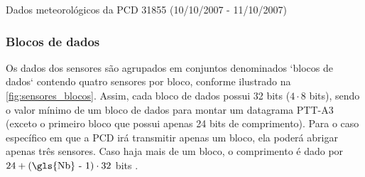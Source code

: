 \begin{quadro}[ht]
\caption{Dados meteorológicos da PCD 31855 (10/10/2007 - 11/10/2007)}\label{quadro:dados-meteorologicos}

\end{quadro}


\subsubsection{Blocos de dados}

Os dados dos sensores são agrupados em conjuntos denominados `blocos de dados` contendo quatro sensores por bloco, conforme ilustrado na \autoref{fig:sensores_blocos}. Assim, cada bloco de dados possui 32 bits ($4 \cdot 8$ bits), sendo o valor mínimo de um bloco de dados para montar um datagrama \gls{PTT-A3} (exceto o primeiro bloco que possui apenas 24 bits de comprimento). Para o caso específico em que a PCD irá transmitir apenas um bloco, ela poderá abrigar apenas três sensores. Caso haja mais de um bloco, o comprimento é dado por $24 + (\text{\gls{Nb} - 1}) \cdot 32$ bits \textcite{cnes_services_and_message_formats_ed2_rev2_2006}.

